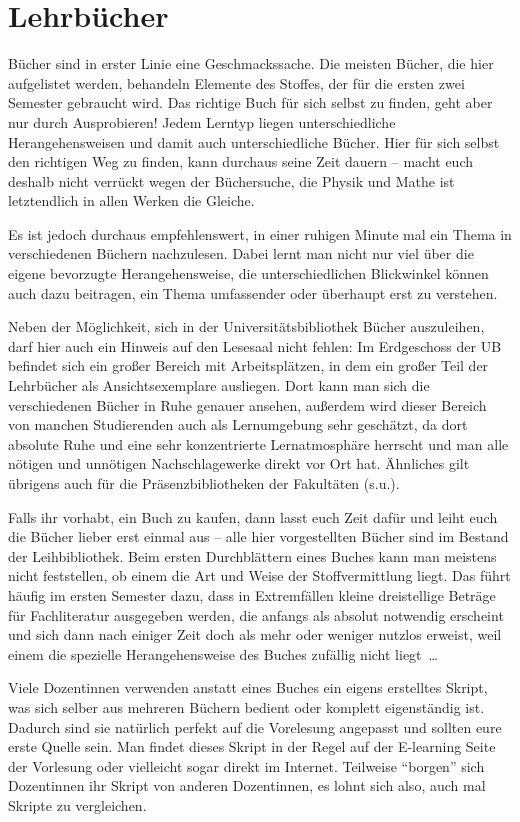 \section{Lehrbücher}

Bücher sind in erster Linie eine Geschmackssache. Die meisten Bücher, die hier aufgelistet werden, behandeln Elemente des Stoffes, der für die ersten zwei Semester gebraucht wird. Das richtige Buch für sich selbst zu finden, geht aber nur durch Ausprobieren! Jedem Lerntyp liegen unterschiedliche Herangehensweisen und damit auch unterschiedliche Bücher. Hier für sich selbst den richtigen Weg zu finden, kann durchaus seine Zeit dauern -- macht euch deshalb nicht verrückt wegen der Büchersuche, die Physik und Mathe ist letztendlich in allen Werken die Gleiche.

Es ist jedoch durchaus empfehlenswert, in einer ruhigen Minute mal ein Thema in verschiedenen Büchern nachzulesen. Dabei lernt man nicht nur viel über die eigene bevorzugte Herangehensweise, die unterschiedlichen Blickwinkel können auch dazu beitragen, ein Thema umfassender oder überhaupt erst zu verstehen.

Neben der Möglichkeit, sich in der Universitätsbibliothek Bücher auszuleihen, darf hier auch ein Hinweis auf den Lesesaal nicht fehlen: Im Erdgeschoss der UB befindet sich ein großer Bereich mit Arbeitsplätzen, in dem ein großer Teil der Lehrbücher als Ansichtsexemplare ausliegen. Dort kann man sich die verschiedenen Bücher in Ruhe genauer ansehen, außerdem wird dieser Bereich von manchen Studierenden auch als Lernumgebung sehr geschätzt, da dort absolute Ruhe und eine sehr konzentrierte Lernatmosphäre herrscht und man alle nötigen und unnötigen Nachschlagewerke direkt vor Ort hat. Ähnliches gilt übrigens auch für die Präsenzbibliotheken der Fakultäten (s.u.).

Falls ihr vorhabt, ein Buch zu kaufen, dann lasst euch Zeit dafür und leiht euch die Bücher lieber erst einmal aus -- alle hier vorgestellten Bücher sind im Bestand der Leihbibliothek. Beim ersten Durchblättern eines Buches kann man meistens nicht feststellen, ob einem die Art und Weise der Stoffvermittlung liegt. Das führt häufig im ersten Semester dazu, dass in Extremfällen kleine dreistellige Beträge für Fachliteratur ausgegeben werden, die anfangs als absolut notwendig erscheint und sich dann nach einiger Zeit doch als mehr oder weniger nutzlos erweist, weil einem die spezielle Herangehensweise des Buches zufällig nicht liegt~\dots

Viele Dozentinnen verwenden anstatt eines Buches ein eigens erstelltes Skript, was sich selber aus mehreren Büchern bedient oder komplett eigenständig ist. Dadurch sind sie natürlich perfekt auf die Vorelesung angepasst und sollten eure erste Quelle sein. Man findet dieses Skript in der Regel auf der E-learning Seite der Vorlesung oder vielleicht sogar direkt im Internet. Teilweise ``borgen'' sich Dozentinnen ihr Skript von anderen Dozentinnen, es lohnt sich also, auch mal Skripte zu vergleichen.




